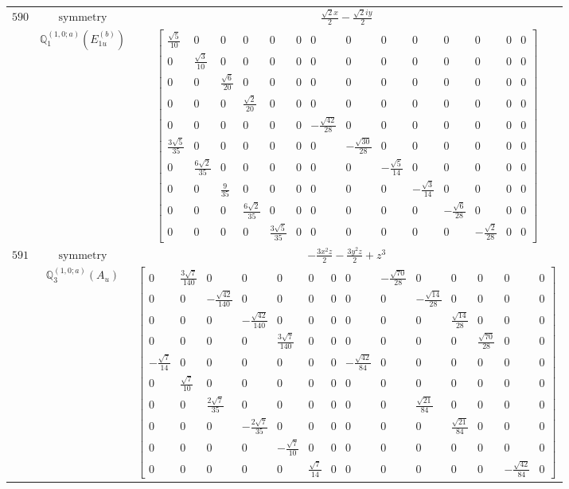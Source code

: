 \documentclass[fleqn,8pt,landscape]{jsarticle}
\begin{document}
\begin{longtable}{ccc}
$ 590 $ & $ \text{symmetry} $ & $ \frac{\sqrt{2} x}{2} - \frac{\sqrt{2} i y}{2} $ \\
$  $ & $ \mathbb{Q}_{1}^{(1,0;a)}(E_{1u}^{(b)}) $ & $ \begin{bmatrix} \frac{\sqrt{5}}{10} & 0 & 0 & 0 & 0 & 0 & 0 & 0 & 0 & 0 & 0 & 0 & 0 & 0 \\ 0 & \frac{\sqrt{3}}{10} & 0 & 0 & 0 & 0 & 0 & 0 & 0 & 0 & 0 & 0 & 0 & 0 \\ 0 & 0 & \frac{\sqrt{6}}{20} & 0 & 0 & 0 & 0 & 0 & 0 & 0 & 0 & 0 & 0 & 0 \\ 0 & 0 & 0 & \frac{\sqrt{2}}{20} & 0 & 0 & 0 & 0 & 0 & 0 & 0 & 0 & 0 & 0 \\ 0 & 0 & 0 & 0 & 0 & 0 & - \frac{\sqrt{42}}{28} & 0 & 0 & 0 & 0 & 0 & 0 & 0 \\ \frac{3 \sqrt{5}}{35} & 0 & 0 & 0 & 0 & 0 & 0 & - \frac{\sqrt{30}}{28} & 0 & 0 & 0 & 0 & 0 & 0 \\ 0 & \frac{6 \sqrt{2}}{35} & 0 & 0 & 0 & 0 & 0 & 0 & - \frac{\sqrt{5}}{14} & 0 & 0 & 0 & 0 & 0 \\ 0 & 0 & \frac{9}{35} & 0 & 0 & 0 & 0 & 0 & 0 & - \frac{\sqrt{3}}{14} & 0 & 0 & 0 & 0 \\ 0 & 0 & 0 & \frac{6 \sqrt{2}}{35} & 0 & 0 & 0 & 0 & 0 & 0 & - \frac{\sqrt{6}}{28} & 0 & 0 & 0 \\ 0 & 0 & 0 & 0 & \frac{3 \sqrt{5}}{35} & 0 & 0 & 0 & 0 & 0 & 0 & - \frac{\sqrt{2}}{28} & 0 & 0 \end{bmatrix} $ \\ \hline
$ 591 $ & $ \text{symmetry} $ & $ - \frac{3 x^{2} z}{2} - \frac{3 y^{2} z}{2} + z^{3} $ \\
$  $ & $ \mathbb{Q}_{3}^{(1,0;a)}(A_{u}) $ & $ \begin{bmatrix} 0 & \frac{3 \sqrt{7}}{140} & 0 & 0 & 0 & 0 & 0 & 0 & - \frac{\sqrt{70}}{28} & 0 & 0 & 0 & 0 & 0 \\ 0 & 0 & - \frac{\sqrt{42}}{140} & 0 & 0 & 0 & 0 & 0 & 0 & - \frac{\sqrt{14}}{28} & 0 & 0 & 0 & 0 \\ 0 & 0 & 0 & - \frac{\sqrt{42}}{140} & 0 & 0 & 0 & 0 & 0 & 0 & \frac{\sqrt{14}}{28} & 0 & 0 & 0 \\ 0 & 0 & 0 & 0 & \frac{3 \sqrt{7}}{140} & 0 & 0 & 0 & 0 & 0 & 0 & \frac{\sqrt{70}}{28} & 0 & 0 \\ - \frac{\sqrt{7}}{14} & 0 & 0 & 0 & 0 & 0 & 0 & - \frac{\sqrt{42}}{84} & 0 & 0 & 0 & 0 & 0 & 0 \\ 0 & \frac{\sqrt{7}}{10} & 0 & 0 & 0 & 0 & 0 & 0 & 0 & 0 & 0 & 0 & 0 & 0 \\ 0 & 0 & \frac{2 \sqrt{7}}{35} & 0 & 0 & 0 & 0 & 0 & 0 & \frac{\sqrt{21}}{84} & 0 & 0 & 0 & 0 \\ 0 & 0 & 0 & - \frac{2 \sqrt{7}}{35} & 0 & 0 & 0 & 0 & 0 & 0 & \frac{\sqrt{21}}{84} & 0 & 0 & 0 \\ 0 & 0 & 0 & 0 & - \frac{\sqrt{7}}{10} & 0 & 0 & 0 & 0 & 0 & 0 & 0 & 0 & 0 \\ 0 & 0 & 0 & 0 & 0 & \frac{\sqrt{7}}{14} & 0 & 0 & 0 & 0 & 0 & 0 & - \frac{\sqrt{42}}{84} & 0 \end{bmatrix} $ \\ \hline

\end{longtable}
\end{document}
